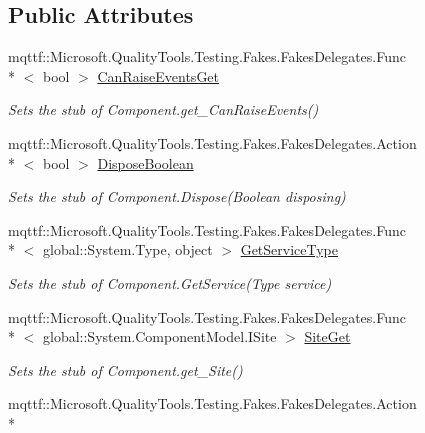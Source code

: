 \subsection*{Public Attributes}
\begin{DoxyCompactItemize}
\item 
mqttf\-::\-Microsoft.\-Quality\-Tools.\-Testing.\-Fakes.\-Fakes\-Delegates.\-Func\\*
$<$ bool $>$ \hyperlink{class_system_1_1_component_model_1_1_fakes_1_1_stub_component_a5995f162f22b64ab66486b62e5cf678b}{Can\-Raise\-Events\-Get}
\begin{DoxyCompactList}\small\item\em Sets the stub of Component.\-get\-\_\-\-Can\-Raise\-Events()\end{DoxyCompactList}\item 
mqttf\-::\-Microsoft.\-Quality\-Tools.\-Testing.\-Fakes.\-Fakes\-Delegates.\-Action\\*
$<$ bool $>$ \hyperlink{class_system_1_1_component_model_1_1_fakes_1_1_stub_component_a7b8eba432113c88ab2b060e48ece3d13}{Dispose\-Boolean}
\begin{DoxyCompactList}\small\item\em Sets the stub of Component.\-Dispose(\-Boolean disposing)\end{DoxyCompactList}\item 
mqttf\-::\-Microsoft.\-Quality\-Tools.\-Testing.\-Fakes.\-Fakes\-Delegates.\-Func\\*
$<$ global\-::\-System.\-Type, object $>$ \hyperlink{class_system_1_1_component_model_1_1_fakes_1_1_stub_component_ad3e16a154104b3bd110b41edc2fa5589}{Get\-Service\-Type}
\begin{DoxyCompactList}\small\item\em Sets the stub of Component.\-Get\-Service(\-Type service)\end{DoxyCompactList}\item 
mqttf\-::\-Microsoft.\-Quality\-Tools.\-Testing.\-Fakes.\-Fakes\-Delegates.\-Func\\*
$<$ global\-::\-System.\-Component\-Model.\-I\-Site $>$ \hyperlink{class_system_1_1_component_model_1_1_fakes_1_1_stub_component_a9dfa357736fcc2520b7a671ec8d12a4c}{Site\-Get}
\begin{DoxyCompactList}\small\item\em Sets the stub of Component.\-get\-\_\-\-Site()\end{DoxyCompactList}\item 
mqttf\-::\-Microsoft.\-Quality\-Tools.\-Testing.\-Fakes.\-Fakes\-Delegates.\-Action\\*

\end{DoxyCompactItemize}
